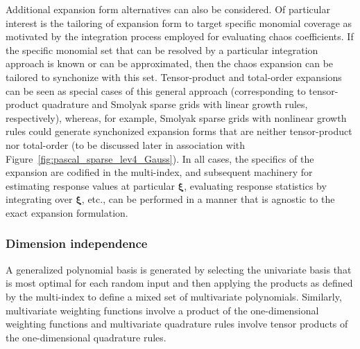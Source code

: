 Additional expansion form alternatives can also be considered.  Of
particular interest is the tailoring of expansion form to target
specific monomial coverage as motivated by the integration process
employed for evaluating chaos coefficients.  If the specific monomial
set that can be resolved by a particular integration approach is known
or can be approximated, then the chaos expansion can be tailored to
synchonize with this set.  Tensor-product and total-order expansions
can be seen as special cases of this general approach (corresponding
to tensor-product quadrature and Smolyak sparse grids with linear
growth rules, respectively), whereas, for example, Smolyak sparse
grids with nonlinear growth rules could generate synchonized expansion
forms that are neither tensor-product nor total-order (to be discussed
later in association with Figure~\ref{fig:pascal_sparse_lev4_Gauss}).
In all cases, the specifics of the expansion are codified in the
multi-index, and subsequent machinery for estimating response values
at particular $\boldsymbol{\xi}$, evaluating response statistics by
integrating over $\boldsymbol{\xi}$, etc., can be performed in a
manner that is agnostic to the exact expansion formulation.


\subsubsection{Dimension independence} \label{uq:expansion:pce:dim_ind}

A generalized polynomial basis is generated by selecting the
univariate basis that is most optimal for each random input and then
applying the products as defined by the multi-index to define a mixed
set of multivariate polynomials.  Similarly, multivariate weighting
functions involve a product of the one-dimensional weighting functions
and multivariate quadrature rules involve tensor products of the
one-dimensional quadrature rules.

